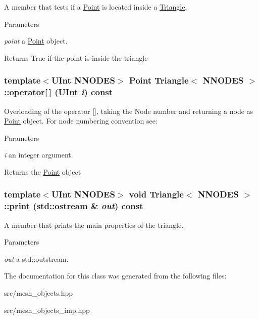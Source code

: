 A member that tests if a \hyperlink{classPoint}{Point} is located inside a \hyperlink{classTriangle}{Triangle}. 
\begin{DoxyParams}{Parameters}
\item[{\em point}]a \hyperlink{classPoint}{Point} object. \end{DoxyParams}
\begin{DoxyReturn}{Returns}
True if the point is inside the triangle 
\end{DoxyReturn}
\hypertarget{classTriangle_a4f2a08d6e79d0992cb23938d0fece62c}{
\subsubsection[{operator[]}]{\setlength{\rightskip}{0pt plus 5cm}template$<$UInt NNODES$>$ {\bf Point} {\bf Triangle}$<$ NNODES $>$::operator\mbox{[}$\,$\mbox{]} (UInt {\em i}) const}}
\label{classTriangle_a4f2a08d6e79d0992cb23938d0fece62c}


Overloading of the operator \mbox{[}\mbox{]}, taking the Node number and returning a node as \hyperlink{classPoint}{Point} object. For node numbering convention see: 
\begin{DoxyParams}{Parameters}
\item[{\em i}]an integer argument. \end{DoxyParams}
\begin{DoxyReturn}{Returns}
the \hyperlink{classPoint}{Point} object 
\end{DoxyReturn}
\hypertarget{classTriangle_a083c32066c8c469e3e0f622ed4ce3e8a}{
\subsubsection[{print}]{\setlength{\rightskip}{0pt plus 5cm}template$<$UInt NNODES$>$ void {\bf Triangle}$<$ NNODES $>$::print (std::ostream \& {\em out}) const}}
\label{classTriangle_a083c32066c8c469e3e0f622ed4ce3e8a}


A member that prints the main properties of the triangle. 
\begin{DoxyParams}{Parameters}
\item[{\em out}]a std::outstream. \end{DoxyParams}


The documentation for this class was generated from the following files:\begin{DoxyCompactItemize}
\item 
src/mesh\_\-objects.hpp\item 
src/mesh\_\-objects\_\-imp.hpp\end{DoxyCompactItemize}
